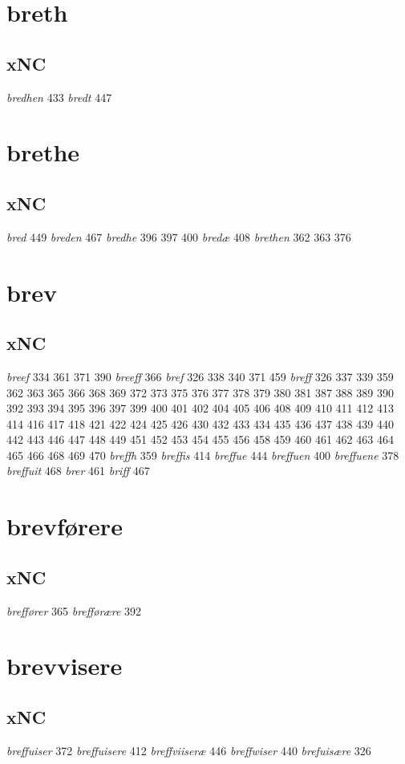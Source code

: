 \documentclass[a4paper,twocolumn]{article}
\begin{document}
\section{breth}
\label{sec:orgeb25258}
\subsection{xNC}
\label{sec:org215588f}
\emph{bredhen} 433 \emph{bredt} 447 
\section{brethe}
\label{sec:orge967e85}
\subsection{xNC}
\label{sec:org37772a1}
\emph{bred} 449 \emph{breden} 467 \emph{bredhe} 396 397 400 \emph{bredæ} 408 \emph{brethen} 362 363 376 
\section{brev}
\label{sec:org403293d}
\subsection{xNC}
\label{sec:org1bb4348}
\emph{breef} 334 361 371 390 \emph{breeff} 366 \emph{bref} 326 338 340 371 459 \emph{breff} 326 337 339 359 362 363 365 366 368 369 372 373 375 376 377 378 379 380 381 387 388 389 390 392 393 394 395 396 397 399 400 401 402 404 405 406 408 409 410 411 412 413 414 416 417 418 421 422 424 425 426 430 432 433 434 435 436 437 438 439 440 442 443 446 447 448 449 451 452 453 454 455 456 458 459 460 461 462 463 464 465 466 468 469 470 \emph{breffh} 359 \emph{breffis} 414 \emph{breffue} 444 \emph{breffuen} 400 \emph{breffuene} 378 \emph{breffuit} 468 \emph{brer} 461 \emph{briff} 467 
\section{brevførere}
\label{sec:org245951c}
\subsection{xNC}
\label{sec:org9d32718}
\emph{breffører} 365 \emph{brefførære} 392 
\section{brevvisere}
\label{sec:orga6c982e}
\subsection{xNC}
\label{sec:org02b1380}
\emph{breffuiser} 372 \emph{breffuisere} 412 \emph{breffviiseræ} 446 \emph{breffwiser} 440 \emph{brefuisære} 326 
\end{document}
